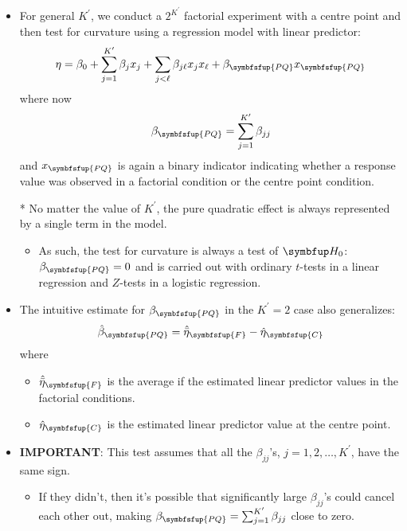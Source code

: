 \begin{itemize}
    \item For general $ K^\prime $, we conduct a $ 2^{K^\prime} $ factorial experiment with a centre point and then test for curvature
          using a regression model with linear predictor:
          \[ \eta=\beta_0+\sum_{j=1}^{K^\prime} \beta_j x_j+\sum_{j<\ell}\beta_{j\ell}x_j x_\ell+\beta_{\symbfsfup{PQ}}x_{\symbfsfup{PQ}} \]
          where now
          \[ \beta_{\symbfsfup{PQ}}=\sum_{j=1}^{K^\prime} \beta_{jj} \]
          and $ x_{\symbfsfup{PQ}} $ is again a binary indicator indicating whether a response value was observed in a factorial
          condition or the centre point condition.
    \item[*] No matter the value of $ K^\prime $, the pure quadratic effect is always represented by a single term in the model.
        \begin{itemize}
            \item As such, the test for curvature is always a test of $ \HN $: $ \beta_{\symbfsfup{PQ}}=0 $ and is carried out with ordinary
                  $t$-tests in a linear regression and $Z$-tests in a logistic regression.
        \end{itemize}
    \item The intuitive estimate for $ \beta_{\symbfsfup{PQ}} $ in the $ K^\prime=2 $ case also generalizes:
          \[ \hat{\beta}_{\symbfsfup{PQ}}=\hat{\bar{\eta}}_{\symbfsfup{F}}-\hat{\eta}_{\symbfsfup{C}} \]
          where
          \begin{itemize}[$\rightarrow$]
              \item $ \hat{\bar{\eta}}_{\symbfsfup{F}} $ is the average if the estimated linear predictor values in the factorial conditions.
              \item $ \hat{\eta}_{\symbfsfup{C}} $ is the estimated linear predictor value at the centre point.
          \end{itemize}
    \item \textbf{IMPORTANT}: This test assumes that all the $ \beta_{jj} $'s, $ j=1,2,\ldots,K^\prime $, have the same sign.
          \begin{itemize}
              \item If they didn't, then it's possible that significantly large $ \beta_{jj} $'s could cancel each other out, making
                    $ \beta_{\symbfsfup{PQ}}=\sum_{j=1}^{K^\prime} \beta_{jj} $ close to zero.
                    \begin{itemize}[$\hookrightarrow$]

\end{itemize}
\end{itemize}
\end{itemize}
